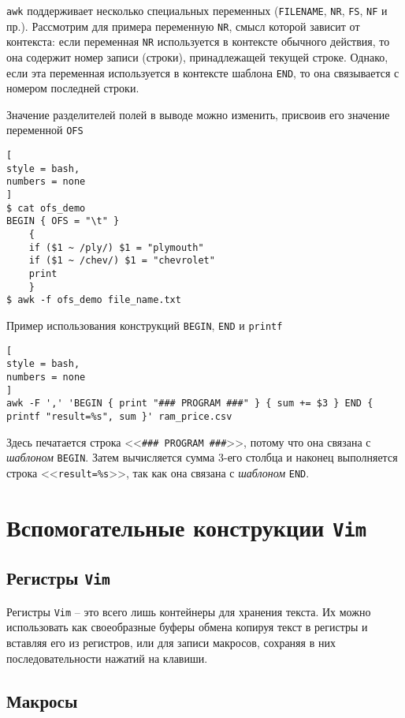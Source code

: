\documentclass[%
	11pt,
	a4paper,
	utf8,
		]{article}
\begin{document}
\texttt{awk} поддерживает несколько специальных переменных (\texttt{FILENAME}, \texttt{NR}, \texttt{FS}, \texttt{NF} и пр.). Рассмотрим для примера переменную \texttt{NR}, смысл которой зависит от контекста: если переменная \texttt{NR} используется в контексте обычного действия, то она содержит номер записи (строки), принадлежащей текущей строке. Однако, если эта переменная используется в контексте шаблона \texttt{END}, то она связывается с номером последней строки.

Значение разделителей полей в выводе можно изменить, присвоив его значение переменной \texttt{OFS}
\begin{lstlisting}[
style = bash,
numbers = none
]
$ cat ofs_demo
BEGIN { OFS = "\t" }
    {
    if ($1 ~ /ply/) $1 = "plymouth"
    if ($1 ~ /chev/) $1 = "chevrolet"
    print
    }
$ awk -f ofs_demo file_name.txt
\end{lstlisting}

Пример использования конструкций \texttt{BEGIN}, \texttt{END} и \texttt{printf}
\begin{lstlisting}[
style = bash,
numbers = none
]
awk -F ',' 'BEGIN { print "### PROGRAM ###" } { sum += $3 } END { printf "result=%s", sum }' ram_price.csv
\end{lstlisting}

Здесь печатается строка <<\verb|### PROGRAM ###|>>, потому что она связана с \emph{шаблоном} \texttt{BEGIN}. Затем вычисляется сумма 3-его столбца и наконец выполняется строка <<\verb|result=%s|>>, так как она связана с \emph{шаблоном} \texttt{END}.



\section{Вспомогательные конструкции \texttt{Vim}}

\subsection{Регистры \texttt{Vim}}

Регистры \texttt{Vim} -- это всего лишь контейнеры для хранения текста. Их можно использовать как своеобразные буферы обмена копируя текст в регистры и вставляя его из регистров, или для записи макросов, сохраняя в них последовательности нажатий на клавиши.

\subsection{Макросы}
\end{document}
